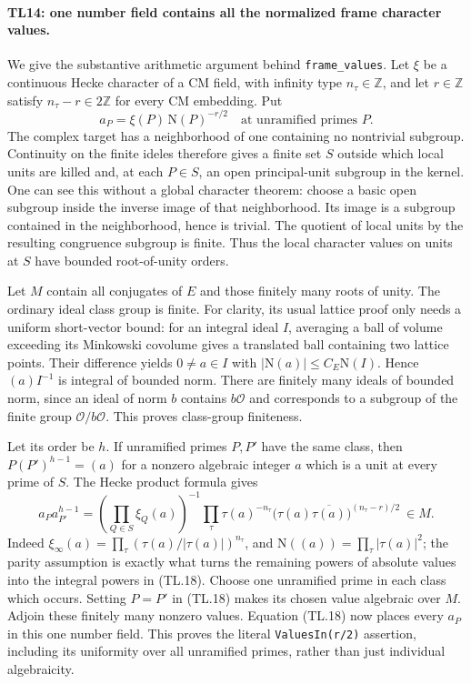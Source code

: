 \paragraph{TL14: one number field contains all the normalized frame
character values.}
We give the substantive arithmetic argument behind
\texttt{frame\_values}. Let $\xi$ be a continuous Hecke character
of a CM field, with infinity type $n_\tau\in\mathbb Z$, and let
$r\in\mathbb Z$ satisfy $n_\tau-r\in2\mathbb Z$ for every CM
embedding. Put
\[
 a_P=\xi(P)\,\mathrm N(P)^{-r/2}
 \quad\text{at unramified primes }P.              \tag{TL.17}
\]
The complex target has a neighborhood of one containing no
nontrivial subgroup. Continuity on the finite ideles therefore
gives a finite set $S$ outside which local units are killed and,
at each $P\in S$, an open principal-unit subgroup in the kernel.
One can see this without a global character theorem: choose a
basic open subgroup inside the inverse image of that neighborhood.
Its image is a subgroup contained in the neighborhood, hence is
trivial. The quotient of local units by the resulting congruence
subgroup is finite. Thus the local character values on units at
$S$ have bounded root-of-unity orders.

Let $M$ contain all conjugates of $E$ and those finitely many roots
of unity. The ordinary ideal class group is finite. For clarity,
its usual lattice proof only needs a uniform short-vector bound:
for an integral ideal $I$, averaging a ball of volume exceeding
its Minkowski covolume gives a translated ball containing two
lattice points. Their difference yields $0\ne a\in I$ with
$|\mathrm N(a)|\le C_E\mathrm N(I)$. Hence
$(a)I^{-1}$ is integral of bounded norm. There are finitely many
ideals of bounded norm, since an ideal of norm $b$ contains
$b\mathcal O$ and corresponds to a subgroup of the finite group
$\mathcal O/b\mathcal O$. This proves class-group finiteness.

Let its order be $h$. If unramified primes $P,P'$ have the same
class, then $P(P')^{h-1}=(a)$ for a nonzero algebraic integer $a$ which is
a unit at every prime of $S$. The Hecke product formula gives
\[
 a_Pa_{P'}^{h-1}
  =\left(\prod_{Q\in S}\xi_Q(a)\right)^{-1}
    \prod_\tau \tau(a)^{-n_\tau}
       \bigl(\tau(a)\overline{\tau(a)}\bigr)^{(n_\tau-r)/2}
  \ \in M.                                         \tag{TL.18}
\]
Indeed $\xi_\infty(a)=\prod_\tau(\tau(a)/|\tau(a)|)^{n_\tau}$,
and $\mathrm N((a))=\prod_\tau|\tau(a)|^2$; the parity assumption
is exactly what turns the remaining powers of absolute values
into the integral powers in (TL.18).
Choose one unramified prime in each class which occurs. Setting
$P=P'$ in (TL.18) makes its chosen value algebraic over $M$.
Adjoin these finitely many nonzero values. Equation (TL.18) now
places every $a_P$ in this one number field. This proves the
literal \texttt{ValuesIn(r/2)} assertion, including its uniformity
over all unramified primes, rather than just individual
algebraicity.

